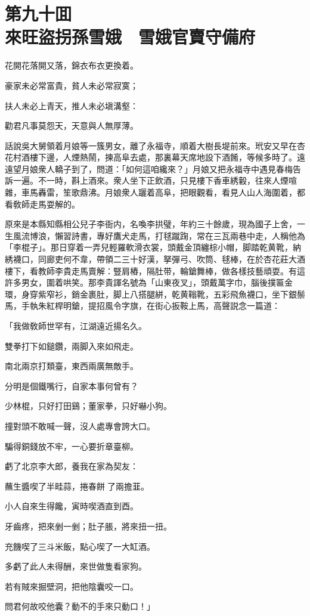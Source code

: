 
\chapter*{第九十囬　\\來旺盜拐孫雪娥　雪娥官賣守備府}


\begin{myquote}
花開花落開又落，錦衣布衣更換着。

豪家未必常富貴，貧人未必常寂寞；

扶人未必上青天，推人未必塡溝壑：

勸君凡事莫怨天，天意與人無厚薄。
\end{myquote}

話說吳大舅領着月娘等一簇男女，離了永福寺，順着大樹長堤前來。玳安又早在杏花村酒樓下邊，人煙熱鬧，揀高阜去處，那裏幕天席地設下酒餚，等候多時了。遠遠望月娘衆人轎子到了，問道：「如何這咱纔來？」月娘又把永福寺中遇見春梅告訴一遍。不一時，斟上酒來。衆人坐下正飲酒，只見樓下香車綉轂，往來人煙喧雜，車馬轟雷，笙歌鼎沸。月娘衆人躧着高阜，把眼觀看，看見人山人海圍着，都看敎師走馬耍解的。

原來是本縣知縣相公兒子李衙内，名喚李拱璧，年約三十餘歲，現為國子上舍，一生風流博浪，懶習詩書，專好鷹犬走馬，打毬蹴踘，常在三瓦兩巷中走，人稱他為「李棍子」。那日穿着一弄兒輕羅軟滑衣裳，頭戴金頂纏棕小帽，脚踏乾黄靴，納綉襪口，同廊吏何不韋，帶領二三十好漢，拏彈弓、吹筒、毬棒，在於杏花莊大酒樓下，看教師李貴走馬賣解：豎肩樁，隔肚带，輪鎗舞棒，做各樣技藝頑耍。有這許多男女，圍着哄笑。那李貴諢名號為「山東夜叉」，頭戴萬字巾，腦後撲匾金環，身穿紫窄衫，銷金裹肚，脚上八搭腿絣，乾黄䩺靴，五彩飛魚襪口，坐下銀鬃馬，手執朱紅桿明鎗，提招風令字旗，在街心扳鞍上馬，高聲説念一篇道：

\begin{myquote}
「我做敎師世罕有，江湖遠近揚名久。

雙拳打下如鎚鑽，兩脚入來如飛走。

南北兩京打類臺，東西兩廣無敵手。

分明是個鐵嘴行，自家本事何曾有？

少林棍，只好打田鷄；董家拳，只好嚇小狗。

撞對頭不敢喊一聲，沒人處專會誇大口。

騙得銅錢放不牢，一心要折章臺柳。

虧了北京李大郎，養我在家為契友：

蘸生醬喫了半畦蒜，捲春餅𠳹了兩擔韮。

小人自來生得饞，寅時喫酒直到酉。

牙齒疼，把來剉一剉；肚子脹，將來扭一扭。

充饑喫了三斗米飯，點心喫了一大缸酒。

多虧了此人未得酬，來世做隻看家狗。

若有賊來掘壁洞，把他陰囊咬一口。

問君何故咬他囊？動不的手來只動口！」
\end{myquote}

